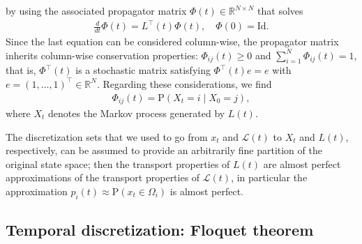 \documentclass[aps, pre, preprint,unsortedaddress,a4paper,onecolumn]{revtex4}
\newcommand{\vect}[1]{#1}
\newcommand{\ml}[0]{\mathcal {L}}
\newcommand{\id}{\mathrm{Id}}
\newcommand{\myphi}{\Phi}
\newcommand{\prob}{\textrm{P}}
\begin{document}
by using the
associated propagator matrix $\myphi(t)\in\mathbb R^{N\times N}$ that solves
\begin{align}
  \label{eq:disc-master-phi}
  \frac{d}{dt}\myphi(t) = \vect L^{\top}(t)\myphi(t), \quad \myphi(0) = \id .
\end{align}
Since the last equation can be considered column-wise, the propagator matrix inherits column-wise conservation properties:
$\Phi_{ij}(t) \ge  0$
and $\sum\limits_{i=1}^N \Phi_{ij}(t)  =  1$,
that is, $\myphi^{\top}(t)$ is a
stochastic matrix satisfying $\myphi^{\top}(t)\vect e=\vect e$
with $\vect e=(1,\ldots,1)^{\top}\in \mathbb R^N$.
Regarding these considerations, we find
\begin{align}
\label{eq:disc-10}  
\myphi_{ij}(t)=\prob\left(\vect X_t=i\mid \vect X_0=j \right),
\end{align}
where $\vect X_t$ denotes the Markov process generated by $\vect L(t)$.
 
The discretization sets that we used to go from $\vect x_t$ and $\ml(t)$ to $\vect X_t$
and $\vect L(t)$, respectively, can be assumed to provide an arbitrarily fine
partition of the original state space; then the transport properties
of $\vect L(t)$ are almost perfect approximations of the transport properties
of $\ml(t)$, in particular the approximation $p_i(t)\approx \prob(x_t\in \Omega_i)$ is almost perfect.

\subsection{Temporal discretization: Floquet theorem}
\label{sec:floquet}
\end{document}
